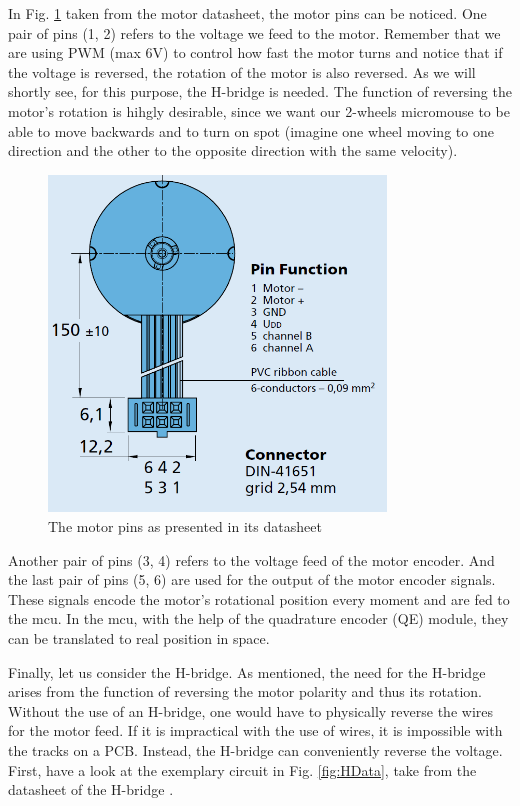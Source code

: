 \FloatBarrier

In Fig. \ref{fig:motorPins} taken from the motor datasheet, the motor pins can be noticed. 
One pair of pins (1, 2) refers to the voltage we feed to the motor. Remember that we are using PWM (max 6V) to control how fast the motor turns and notice that if the voltage is reversed, the rotation of the motor is also reversed. As we will shortly see, for this purpose, the H-bridge is needed. The function of reversing the motor's rotation is hihgly desirable, since we want our 2-wheels micromouse to be able to move backwards and to turn on spot (imagine one wheel moving to one direction and the other to the opposite direction with the same velocity).

\begin{figure}[htb]
    \centering
    \includegraphics[width=0.8\textwidth]{figures/hardware/motor.PNG}
    \caption{The motor pins as presented in its datasheet}
    \label{fig:motorPins}
\end{figure}

\FloatBarrier

Another pair of pins (3, 4) refers to the voltage feed of the motor encoder. And the last pair of pins (5, 6) are used for the output of the motor encoder signals. These signals encode the motor's rotational position every moment and are fed to the mcu. In the mcu, with the help of the quadrature encoder (QE) module, they can be translated to real position in space.

Finally, let us consider the H-bridge. As mentioned, the need for the H-bridge arises from the function of reversing the motor polarity and thus its rotation. Without the use of an H-bridge, one would have to physically reverse the wires for the motor feed. If it is impractical with the use of wires, it is impossible with the tracks on a PCB. Instead, the H-bridge can conveniently reverse the voltage. First, have a look at the exemplary circuit in Fig. \ref{fig:HData}, take from the datasheet of the H-bridge \cite{Hbridge}.

